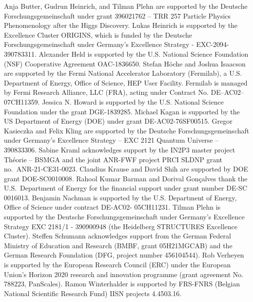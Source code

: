 \documentclass[submission,Phys]{SciPost}
\begin{document}
Anja Butter, Gudrun Heinrich, and Tilman Plehn are supported by the Deutsche Forschungsgemeinschaft under grant 396021762 – TRR 257 Particle Physics Phenomenology after the Higgs Discovery. Lukas Heinrich is supported by the Excellence Cluster ORIGINS, which is funded by the Deutsche Forschungsgemeinschaft under Germany’s Excellence Strategy - EXC-2094-390783311. Alexander Held is supported by the U.S. National Science Foundation (NSF) Cooperative Agreement OAC-1836650. Stefan H{\"o}che and Joshua Isaacson are supported by the Fermi National Accelerator Laboratory (Fermilab), a U.S. Department of Energy, Office of Science, HEP User Facility. Fermilab is managed by Fermi Research Alliance, LLC (FRA), acting under Contract No. DE--AC02--07CH11359. Jessica N. Howard is supported by the U.S. National Science Foundation under the grant DGE-1839285. Michael Kagan is supported by the US Department of Energy (DOE) under grant DE-AC02-76SF00515. Gregor Kasieczka and Felix Kling are supported by the Deutsche Forschungsgemeinschaft under Germany’s Excellence Strategy -- EXC 2121 Quantum Universe -- 390833306. Sabine Kraml acknowledges support by the IN2P3 master project Th\'eorie -- BSMGA and the joint ANR-FWF project PRCI SLDNP grant no.~ANR-21-CE31-0023. Claudius Krause and David Shih are supported by DOE grant DOE-SC0010008. Rahool Kumar Barman and Dorival Gon\c{c}alves thank the U.S.~Department of Energy for the financial support under grant number DE-SC 0016013. Benjamin Nachman is supported by the U.S. Department of Energy, Office of Science under contract DE-AC02- 05CH11231. Tilman Plehn is supported by the Deutsche Forschungsgemeinschaft under Germany's Excellence Strategy EXC 2181/1 - 390900948 (the Heidelberg STRUCTURES Excellence Cluster). Steffen Schumann acknowledges support from the German Federal Ministry of Education and Research (BMBF, grant 05H21MGCAB) and the German Research Foundation (DFG, project number 456104544). Rob Verheyen is supported by the European Research Council (ERC) under the European Union’s Horizon 2020 research and innovation programme (grant agreement No. 788223, PanScales). Ramon Winterhalder is supported by FRS-FNRS (Belgian National Scientific Research Fund) IISN projects 4.4503.16. 



\end{document}
